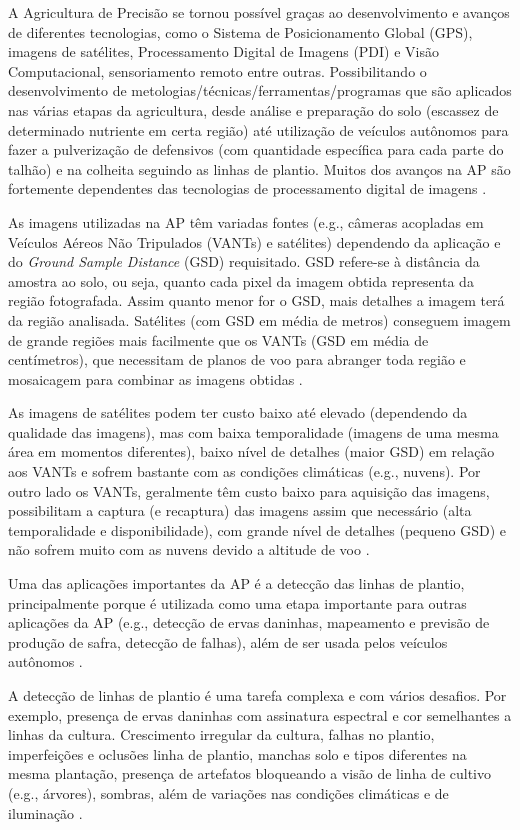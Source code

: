 \documentclass[12pt, a4paper, english, brazil]{article}
\begin{document}
A Agricultura de Precisão se tornou possível graças ao desenvolvimento e avanços de diferentes tecnologias, como o Sistema de Posicionamento Global (GPS), imagens de satélites, Processamento Digital de Imagens (PDI) e Visão Computacional, sensoriamento remoto entre outras. Possibilitando o desenvolvimento de metologias/técnicas/ferramentas/programas que são aplicados nas várias etapas da agricultura, desde análise e preparação do solo (escassez de determinado nutriente em certa região) até utilização de veículos autônomos para fazer a pulverização de defensivos (com quantidade específica para cada parte do talhão) e na colheita seguindo as linhas de plantio. Muitos dos avanços na AP são fortemente dependentes das tecnologias de processamento digital de imagens \cite{Bolfe_2020}.

As imagens utilizadas na AP têm variadas fontes (e.g., câmeras acopladas em Veículos Aéreos Não Tripulados (VANTs) e satélites) dependendo da aplicação e do \textit{Ground Sample Distance} (GSD) requisitado. GSD refere-se à distância da amostra ao solo, ou seja, quanto cada pixel da imagem obtida representa da região fotografada. Assim quanto menor for o GSD, mais detalhes a imagem terá da região analisada. Satélites (com GSD em média de metros) conseguem imagem de grande regiões mais facilmente que os VANTs (GSD em média de centímetros), que necessitam de planos de voo para abranger toda região e mosaicagem para combinar as imagens obtidas \cite{Messina_2020}.

As imagens de satélites podem ter custo baixo até elevado (dependendo da qualidade das imagens), mas com baixa temporalidade (imagens de uma mesma área em momentos diferentes), baixo nível de detalhes (maior GSD) em relação aos VANTs e sofrem bastante com as condições climáticas (e.g., nuvens). Por outro lado os VANTs, geralmente têm custo baixo para aquisição das imagens, possibilitam a captura (e recaptura) das imagens assim que necessário (alta temporalidade e disponibilidade), com grande nível de detalhes (pequeno GSD) e não sofrem muito com as nuvens devido a altitude de voo \cite{Candiago_2015, Delavarpour_2021}.

Uma das aplicações importantes da AP é a detecção das linhas de plantio, principalmente porque é utilizada como uma etapa importante para outras aplicações da AP (e.g., detecção de ervas daninhas, mapeamento e previsão de produção de safra, detecção de falhas), além de ser usada pelos veículos autônomos \cite{Hassanein_2019}.

A detecção de linhas de plantio é uma tarefa complexa e com vários desafios. Por exemplo, presença de ervas daninhas com assinatura espectral e cor semelhantes a linhas da cultura. Crescimento irregular da cultura, falhas no plantio, imperfeições e oclusões linha de plantio, manchas solo e tipos diferentes na mesma plantação, presença de artefatos bloqueando a visão de linha de cultivo (e.g., árvores), sombras, além de variações nas condições climáticas e de iluminação \cite{Rabab_2021, Doha_2021}.
\end{document}
